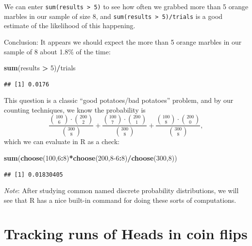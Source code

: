\documentclass[
]{book}
\newenvironment{Shaded}{\begin{snugshade}}{\end{snugshade}}
\newcommand{\DecValTok}[1]{\textcolor[rgb]{0.00,0.00,0.81}{#1}}
\newcommand{\FunctionTok}[1]{\textcolor[rgb]{0.13,0.29,0.53}{\textbf{#1}}}
\newcommand{\NormalTok}[1]{#1}
\newcommand{\SpecialCharTok}[1]{\textcolor[rgb]{0.81,0.36,0.00}{\textbf{#1}}}
\theoremstyle{definition}
\theoremstyle{definition}
\theoremstyle{definition}
\theoremstyle{definition}
\theoremstyle{remark}
\begin{document}
We can enter \texttt{sum(results\ \textgreater{}\ 5)} to see how often we grabbed more than 5 orange marbles in our sample of size 8, and \texttt{sum(results\ \textgreater{}\ 5)/trials} is a good estimate of the likelihood of this happening.

Conclusion: It appears we should expect the more than 5 orange marbles in our sample of 8 about 1.8\% of the time:

\begin{Shaded}
\begin{Highlighting}[]
\FunctionTok{sum}\NormalTok{(results }\SpecialCharTok{\textgreater{}} \DecValTok{5}\NormalTok{)}\SpecialCharTok{/}\NormalTok{trials}
\end{Highlighting}
\end{Shaded}

\begin{verbatim}
## [1] 0.0176
\end{verbatim}

This question is a classic ``good potatoes/bad potatoes'' problem, and by our counting techniques, we know the probability is \[\frac{\binom{100}{6}\cdot\binom{200}{2}}{\binom{300}{8}}+
\frac{\binom{100}{7}\cdot\binom{200}{1}}{\binom{300}{8}}+
\frac{\binom{100}{8}\cdot\binom{200}{0}}{\binom{300}{8}},\]
which we can evaluate in R as a check:

\begin{Shaded}
\begin{Highlighting}[]
\FunctionTok{sum}\NormalTok{(}\FunctionTok{choose}\NormalTok{(}\DecValTok{100}\NormalTok{,}\DecValTok{6}\SpecialCharTok{:}\DecValTok{8}\NormalTok{)}\SpecialCharTok{*}\FunctionTok{choose}\NormalTok{(}\DecValTok{200}\NormalTok{,}\DecValTok{8{-}6}\SpecialCharTok{:}\DecValTok{8}\NormalTok{)}\SpecialCharTok{/}\FunctionTok{choose}\NormalTok{(}\DecValTok{300}\NormalTok{,}\DecValTok{8}\NormalTok{))}
\end{Highlighting}
\end{Shaded}

\begin{verbatim}
## [1] 0.01830405
\end{verbatim}

\emph{Note}: After studying common named discrete probability distributions, we will see that R has a nice built-in command for doing these sorts of computations.

\section{Tracking runs of Heads in coin flips}\label{flip-coin-R}
\end{document}
